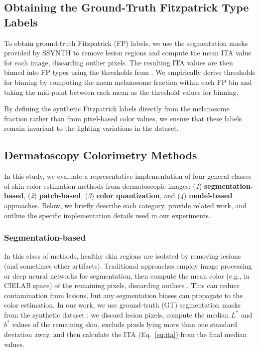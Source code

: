 \documentclass[a4paper,conference]{IEEEtran}
\begin{document}
\subsection{Obtaining the Ground-Truth Fitzpatrick Type Labels}

To obtain ground-truth Fitzpatrick (FP) labels, we use the segmentation masks provided by SSYNTH to remove lesion regions and compute the mean ITA value for each image, discarding outlier pixels. The resulting ITA values are then binned into FP types using the thresholds from \cite{kinyanjuiEstimatingSkinTone2019}. We empirically derive thresholds for binning by computing the mean melanosome fraction within each FP bin and taking the mid-point between each mean as the threshold values for binning.

By defining the synthetic Fitzpatrick labels directly from the melanosome fraction rather than from pixel-based color values, we ensure that these labels remain invariant to the lighting variations in the dataset.

\subsection{Dermatoscopy Colorimetry Methods}
\label{sec:colorimetry}

In this study, we evaluate a representative implementation of four general classes of skin color estimation methods from dermatoscopic images:
(\emph{1}) \textbf{segmentation-based}, 
(\emph{2}) \textbf{patch-based}, 
(\emph{3}) \textbf{color quantization}, and 
(\emph{4}) \textbf{model-based} approaches. 
Below, we briefly describe each category, provide related work, and outline the specific implementation details used in our experiments.

\subsubsection{Segmentation-based}
In this class of methods, healthy skin regions are isolated by removing lesions (and sometimes other artifacts). 
Traditional approaches employ image processing or deep neural networks for segmentation, then compute the mean color 
(e.g., in CIELAB space) of the remaining pixels, discarding outliers \cite{kinyanjuiEstimatingSkinTone2019}. 
This can reduce contamination from lesions, but any segmentation biases can propagate to the color estimation. 
In our work, we use ground-truth (GT) segmentation masks from the synthetic dataset \cite{kim2024ssynth}: 
we discard lesion pixels, compute the median \(L^*\) and \(b^*\) values of the remaining skin, exclude pixels lying 
more than one standard deviation away, and then calculate the ITA (Eq.~\ref{eq:ita}) from the final median values.
\end{document}
